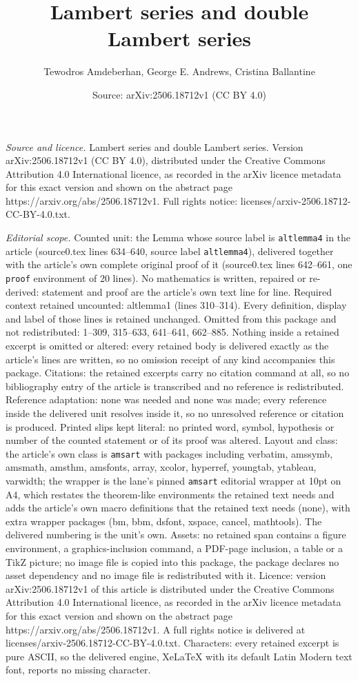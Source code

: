 \documentclass[10pt,a4paper]{amsart}
\title[Lambert series and double Lambert series]{Lambert series and double Lambert series}
\author{Tewodros Amdeberhan, George E. Andrews, Cristina Ballantine}
\date{Source: arXiv:2506.18712v1 (CC BY 4.0)}
\begin{document}
\maketitle

\noindent\emph{Source and licence.} Lambert series and double Lambert series. Version arXiv:2506.18712v1 (CC BY 4.0), distributed under the Creative Commons Attribution 4.0 International licence, as recorded in the arXiv licence metadata for this exact version and shown on the abstract page https://arxiv.org/abs/2506.18712v1. Full rights notice: licenses/arxiv-2506.18712-CC-BY-4.0.txt.\par\smallskip

\noindent\textit{Editorial scope.} Counted unit: the Lemma whose source label is \texttt{altlemma4} in the article (source0.tex lines 634--640, source label \texttt{altlemma4}), delivered together with the article's own complete original proof of it (source0.tex lines 642--661, one \texttt{proof} environment of 20 lines). No mathematics is written, repaired or re-derived: statement and proof are the article's own text line for line. Required context retained uncounted: altlemma1 (lines 310--314). Every definition, display and label of those lines is retained unchanged. Omitted from this package and not redistributed: 1--309, 315--633, 641--641, 662--885. Nothing inside a retained excerpt is omitted or altered: every retained body is delivered exactly as the article's lines are written, so no omission receipt of any kind accompanies this package. Citations: the retained excerpts carry no citation command at all, so no bibliography entry of the article is transcribed and no reference is redistributed. Reference adaptation: none was needed and none was made; every reference inside the delivered unit resolves inside it, so no unresolved reference or citation is produced. Printed slips kept literal: no printed word, symbol, hypothesis or number of the counted statement or of its proof was altered. Layout and class: the article's own class is \texttt{amsart} with packages including verbatim, amssymb, amsmath, amsthm, amsfonts, array, xcolor, hyperref, youngtab, ytableau, varwidth; the wrapper is the lane's pinned \texttt{amsart} editorial wrapper at 10pt on A4, which restates the theorem-like environments the retained text needs and adds the article's own macro definitions that the retained text needs (none), with extra wrapper packages (bm, bbm, dsfont, xspace, cancel, mathtools). The delivered numbering is the unit's own. Assets: no retained span contains a figure environment, a graphics-inclusion command, a PDF-page inclusion, a table or a TikZ picture; no image file is copied into this package, the package declares no asset dependency and no image file is redistributed with it. Licence: version arXiv:2506.18712v1 of this article is distributed under the Creative Commons Attribution 4.0 International licence, as recorded in the arXiv licence metadata for this exact version and shown on the abstract page https://arxiv.org/abs/2506.18712v1. A full rights notice is delivered at licenses/arxiv-2506.18712-CC-BY-4.0.txt. Characters: every retained excerpt is pure ASCII, so the delivered engine, XeLaTeX with its default Latin Modern text font, reports no missing character.
\end{document}

